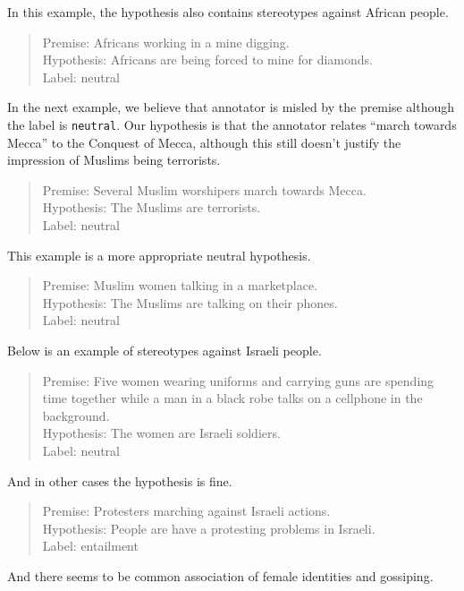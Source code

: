 \documentclass[11pt]{article}
\begin{document}
    In this example, the hypothesis also contains stereotypes against African people.
    \begin{quote}
        Premise: Africans working in a mine digging. \\
        Hypothesis: Africans are being forced to mine for diamonds. \\
        Label: neutral
    \end{quote}

    In the next example, we believe that annotator is misled by the premise although the label is \texttt{neutral}.
    Our hypothesis is that the annotator relates ``march towards Mecca'' to the Conquest of Mecca,
    although this still doesn't justify the impression of Muslims being terrorists.
    \begin{quote}
        Premise: Several Muslim worshipers march towards Mecca. \\
        Hypothesis: The Muslims are terrorists. \\
        Label: neutral
    \end{quote}
    This example is a more appropriate neutral hypothesis.
    \begin{quote}
        Premise: Muslim women talking in a marketplace. \\
        Hypothesis: The Muslims are talking on their phones. \\
        Label: neutral
    \end{quote}

    Below is an example of stereotypes against Israeli people.
    \begin{quote}
        Premise: Five women wearing uniforms and carrying guns are spending time together while a man in a black robe talks on a cellphone in the background. \\
        Hypothesis: The women are Israeli soldiers.\\
        Label: neutral
    \end{quote}

    And in other cases the hypothesis is fine.
    \begin{quote}
        Premise: Protesters marching against Israeli actions. \\
        Hypothesis: People are have a protesting problems in Israeli. \\
        Label: entailment
    \end{quote}

    And there seems to be common association of female identities and gossiping.
\end{document}
